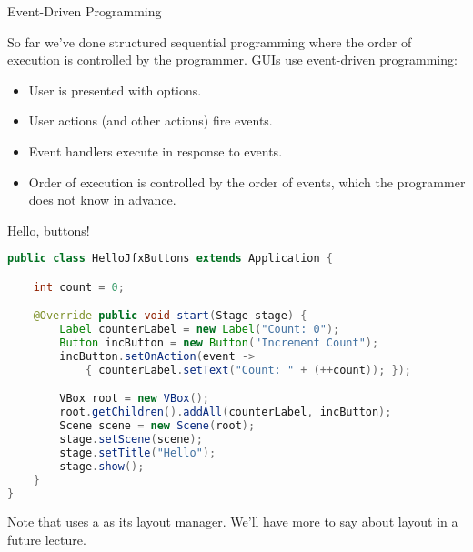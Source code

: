 \documentclass{beamer}
\begin{document}
\begin{frame}[fragile]{Event-Driven Programming}


So far we've done structured sequential programming where the order of execution is controlled by the programmer.  GUIs use event-driven programming:
\begin{itemize}
\item User is presented with options.
\item User actions (and other actions) fire events.
\item Event handlers execute in response to events.
\item Order of execution is controlled by the order of events, which the programmer does not know in advance.
\end{itemize}


\end{frame}

\begin{frame}[fragile]{Hello, buttons!}

\vspace{-.1in}
\begin{lstlisting}[language=Java]
public class HelloJfxButtons extends Application {

    int count = 0;

    @Override public void start(Stage stage) {
        Label counterLabel = new Label("Count: 0");
        Button incButton = new Button("Increment Count");
        incButton.setOnAction(event ->
            { counterLabel.setText("Count: " + (++count)); });

        VBox root = new VBox();
        root.getChildren().addAll(counterLabel, incButton);
        Scene scene = new Scene(root);
        stage.setScene(scene);
        stage.setTitle("Hello");
        stage.show();
    }
}
\end{lstlisting}
Note that  uses a  as its layout manager.  We'll have more to say about layout in a future lecture.

\end{frame}
\end{document}
